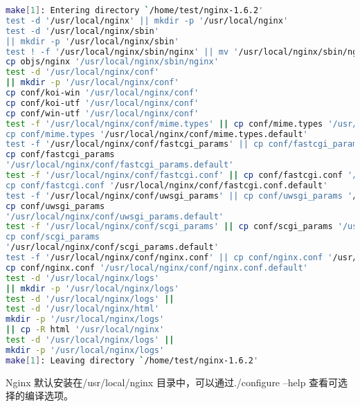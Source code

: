 \begin{lstlisting}[language=bash]
make[1]: Entering directory `/home/test/nginx-1.6.2'
test -d '/usr/local/nginx' || mkdir -p '/usr/local/nginx'
test -d '/usr/local/nginx/sbin'
|| mkdir -p '/usr/local/nginx/sbin'
test ! -f '/usr/local/nginx/sbin/nginx' || mv '/usr/local/nginx/sbin/nginx' '/usr/local
cp objs/nginx '/usr/local/nginx/sbin/nginx'
test -d '/usr/local/nginx/conf'
|| mkdir -p '/usr/local/nginx/conf'
cp conf/koi-win '/usr/local/nginx/conf'
cp conf/koi-utf '/usr/local/nginx/conf'
cp conf/win-utf '/usr/local/nginx/conf'
test -f '/usr/local/nginx/conf/mime.types' || cp conf/mime.types '/usr/local/nginx/conf
cp conf/mime.types '/usr/local/nginx/conf/mime.types.default'
test -f '/usr/local/nginx/conf/fastcgi_params' || cp conf/fastcgi_params '/usr/local/ng
cp conf/fastcgi_params
'/usr/local/nginx/conf/fastcgi_params.default'
test -f '/usr/local/nginx/conf/fastcgi.conf' || cp conf/fastcgi.conf '/usr/local/nginx/
cp conf/fastcgi.conf '/usr/local/nginx/conf/fastcgi.conf.default'
test -f '/usr/local/nginx/conf/uwsgi_params' || cp conf/uwsgi_params '/usr/local/nginx/
cp conf/uwsgi_params
'/usr/local/nginx/conf/uwsgi_params.default'
test -f '/usr/local/nginx/conf/scgi_params' || cp conf/scgi_params '/usr/local/nginx/co
cp conf/scgi_params
'/usr/local/nginx/conf/scgi_params.default'
test -f '/usr/local/nginx/conf/nginx.conf' || cp conf/nginx.conf '/usr/local/nginx/conf
cp conf/nginx.conf '/usr/local/nginx/conf/nginx.conf.default'
test -d '/usr/local/nginx/logs'
|| mkdir -p '/usr/local/nginx/logs'
test -d '/usr/local/nginx/logs' ||
test -d '/usr/local/nginx/html'
mkdir -p '/usr/local/nginx/logs'
|| cp -R html '/usr/local/nginx'
test -d '/usr/local/nginx/logs' ||
mkdir -p '/usr/local/nginx/logs'
make[1]: Leaving directory `/home/test/nginx-1.6.2'
\end{lstlisting}


Nginx 默认安装在/usr/local/nginx 目录中，可以通过./configure --help 查看可选择的编译选项。

\begin{lstlisting}[language=bash]

\end{lstlisting}


